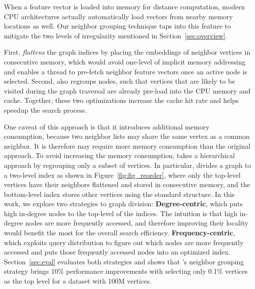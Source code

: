 When a feature vector is loaded into memory for distance computation, modern CPU architectures actually automatically load vectors from nearby memory locations as well. 
Our neighbor grouping technique taps into this feature to mitigate the two levels of irregularity mentioned in Section~\ref{sec:overview}.

First, \Hammer \emph{flattens} the graph indices by placing the embeddings of neighbor vertices in consecutive memory, which would avoid one-level of implicit memory addressing and enables a thread to pre-fetch neighbor feature vectors once an active node is selected.  Second, \Hammer also regroups nodes, such that vertices that are likely to be visited during the graph traversal are already pre-load into the CPU memory and cache. Together, these two optimizations increase the cache hit rate and helps speedup the search process. 


One caveat of this approach is that it introduces additional memory consumption, because two neighbor lists may share the same vertex as a common neighbor. It is therefore may require more memory consumption than the original approach.
To avoid increasing the memory consumption, \Hammer takes a hierarchical approach by regrouping only a subset of vertices. In particular, \Hammer divides a graph to a two-level index as shown in Figure~\ref{fig:fig_reorder}, where only the top-level vertices have their neighbors flattened and stored in consecutive memory, and the bottom-level index stores other vertices using the standard structure. 
In this work, we explore two strategies to graph division: 
     \textbf{Degree-centric}, which puts high in-degree nodes to the top-level of the indices. The intuition is that high in-degree nodes are more frequently accessed, and therefore improving their locality would benefit the most for the overall search efficiency.
     \textbf{Frequency-centric}, which exploits query distribution to figure out which nodes are more frequently accessed and puts those frequently accessed nodes into an optimized index.
Section~\ref{sec:eval} evaluates both strategies and shows that \Hammer's neighbor grouping strategy brings 10\% performance improvements with selecting only 0.1\% vertices as the top level for a dataset with 100M vertices.



